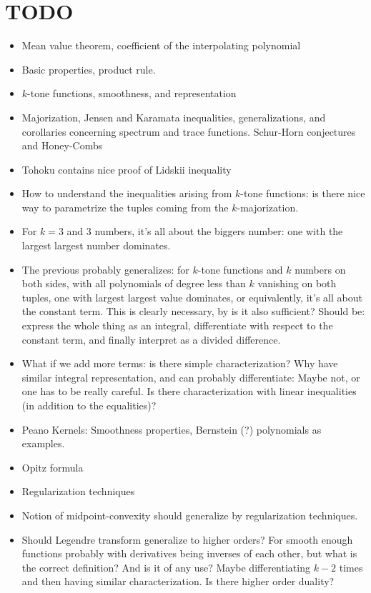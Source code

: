 \section{TODO}
\begin{itemize}
	\item Mean value theorem, coefficient of the interpolating polynomial
	\item Basic properties, product rule.
	\item $k$-tone functions, smoothness, and representation
	\item Majorization, Jensen and Karamata inequalities, generalizations, and corollaries concerning spectrum and trace functions. Schur-Horn conjectures and Honey-Combs
	\item Tohoku contains nice proof of Lidskii inequality
	\item How to understand the inequalities arising from $k$-tone functions: is there nice way to parametrize the tuples coming from the $k$-majorization.
	\item For $k = 3$ and $3$ numbers, it's all about the biggers number: one with the largest largest number dominates.
	\item The previous probably generalizes: for $k$-tone functions and $k$ numbers on both sides, with all polynomials of degree less than $k$ vanishing on both tuples, one with largest largest value dominates, or equivalently, it's all about the constant term. This is clearly necessary, by is it also sufficient? Should be: express the whole thing as an integral, differentiate with respect to the constant term, and finally interpret as a divided difference.
	\item What if we add more terms: is there simple characterization? Why have similar integral representation, and can probably differentiate: Maybe not, or one has to be really careful. Is there characterization with linear inequalities (in addition to the equalities)?
	\item Peano Kernels: Smoothness properties, Bernstein (?) polynomials as examples.
	\item Opitz formula
	\item Regularization techniques
	\item Notion of midpoint-convexity should generalize by regularization techniques.
	\item Should Legendre transform generalize to higher orders?  For smooth enough functions probably with derivatives being inverses of each other, but what is the correct definition? And is it of any use? Maybe differentiating $k - 2$ times and then having similar characterization. Is there higher order duality?

\end{itemize}
